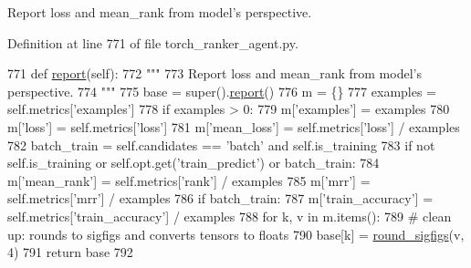 \begin{DoxyVerb}Report loss and mean_rank from model's perspective.
\end{DoxyVerb}
 

Definition at line 771 of file torch\+\_\+ranker\+\_\+agent.\+py.


\begin{DoxyCode}
771     \textcolor{keyword}{def }\hyperlink{namespaceprojects_1_1convai2_1_1eval__f1_a01a47b9c08dad189837a51f085defc45}{report}(self):
772         \textcolor{stringliteral}{"""}
773 \textcolor{stringliteral}{        Report loss and mean\_rank from model's perspective.}
774 \textcolor{stringliteral}{        """}
775         base = super().\hyperlink{namespaceprojects_1_1convai2_1_1eval__f1_a01a47b9c08dad189837a51f085defc45}{report}()
776         m = \{\}
777         examples = self.metrics[\textcolor{stringliteral}{'examples'}]
778         \textcolor{keywordflow}{if} examples > 0:
779             m[\textcolor{stringliteral}{'examples'}] = examples
780             m[\textcolor{stringliteral}{'loss'}] = self.metrics[\textcolor{stringliteral}{'loss'}]
781             m[\textcolor{stringliteral}{'mean\_loss'}] = self.metrics[\textcolor{stringliteral}{'loss'}] / examples
782             batch\_train = self.candidates == \textcolor{stringliteral}{'batch'} \textcolor{keywordflow}{and} self.is\_training
783             \textcolor{keywordflow}{if} \textcolor{keywordflow}{not} self.is\_training \textcolor{keywordflow}{or} self.opt.get(\textcolor{stringliteral}{'train\_predict'}) \textcolor{keywordflow}{or} batch\_train:
784                 m[\textcolor{stringliteral}{'mean\_rank'}] = self.metrics[\textcolor{stringliteral}{'rank'}] / examples
785                 m[\textcolor{stringliteral}{'mrr'}] = self.metrics[\textcolor{stringliteral}{'mrr'}] / examples
786             \textcolor{keywordflow}{if} batch\_train:
787                 m[\textcolor{stringliteral}{'train\_accuracy'}] = self.metrics[\textcolor{stringliteral}{'train\_accuracy'}] / examples
788         \textcolor{keywordflow}{for} k, v \textcolor{keywordflow}{in} m.items():
789             \textcolor{comment}{# clean up: rounds to sigfigs and converts tensors to floats}
790             base[k] = \hyperlink{namespaceparlai_1_1agents_1_1legacy__agents_1_1seq2seq_1_1utils__v0_af377ec61bfc0423461e7b409ffc883b9}{round\_sigfigs}(v, 4)
791         \textcolor{keywordflow}{return} base
792 
\end{DoxyCode}
\mbox{\label{classparlai_1_1core_1_1torch__ranker__agent_1_1TorchRankerAgent_ab526b2171567fd980451a795bb639cda}} 
